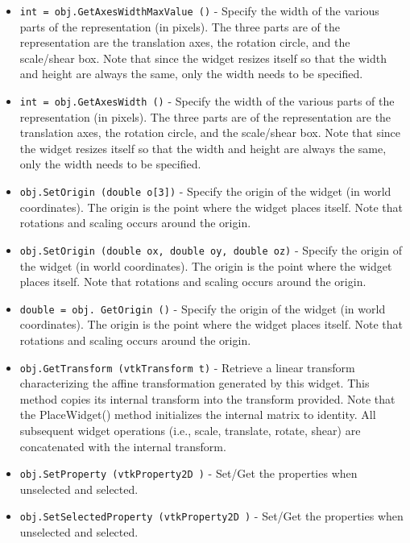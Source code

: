 \begin{itemize}
\item  \verb|int = obj.GetAxesWidthMaxValue ()| -  Specify the width of the various parts of the representation (in
 pixels).  The three parts are of the representation are the translation
 axes, the rotation circle, and the scale/shear box. Note that since the
 widget resizes itself so that the width and height are always the
 same, only the width needs to be specified.

\item  \verb|int = obj.GetAxesWidth ()| -  Specify the width of the various parts of the representation (in
 pixels).  The three parts are of the representation are the translation
 axes, the rotation circle, and the scale/shear box. Note that since the
 widget resizes itself so that the width and height are always the
 same, only the width needs to be specified.

\item  \verb|obj.SetOrigin (double o[3])| -  Specify the origin of the widget (in world coordinates). The origin
 is the point where the widget places itself. Note that rotations and
 scaling occurs around the origin.

\item  \verb|obj.SetOrigin (double ox, double oy, double oz)| -  Specify the origin of the widget (in world coordinates). The origin
 is the point where the widget places itself. Note that rotations and
 scaling occurs around the origin.

\item  \verb|double = obj. GetOrigin ()| -  Specify the origin of the widget (in world coordinates). The origin
 is the point where the widget places itself. Note that rotations and
 scaling occurs around the origin.

\item  \verb|obj.GetTransform (vtkTransform t)| -  Retrieve a linear transform characterizing the affine transformation
 generated by this widget. This method copies its internal transform into
 the transform provided. Note that the PlaceWidget() method initializes
 the internal matrix to identity. All subsequent widget operations (i.e.,
 scale, translate, rotate, shear) are concatenated with the internal
 transform.

\item  \verb|obj.SetProperty (vtkProperty2D )| -  Set/Get the properties when unselected and selected.

\item  \verb|obj.SetSelectedProperty (vtkProperty2D )| -  Set/Get the properties when unselected and selected.


\end{itemize}

